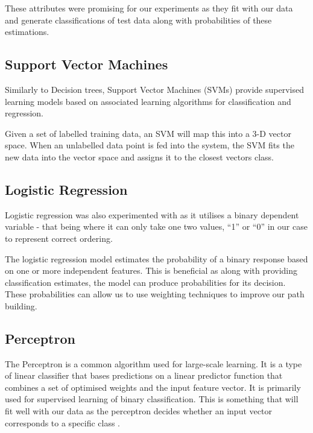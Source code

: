 \documentclass[bsc,frontabs,twoside,singlespacing,parskip,deptreport]{infthesis}     %
\begin{document}
These attributes were promising for our experiments as they fit with our data and generate
classifications of test data along with probabilities of these estimations.


\subsection{Support Vector Machines}
Similarly to Decision trees, Support Vector Machines (SVMs) provide supervised learning models based on
associated learning algorithms for classification and regression.

Given a set of labelled training data, an SVM will map this into a 3-D vector space.
When an unlabelled data point is fed into the system, the SVM fits the new data into the vector space and
assigns  it to the closest vectors class.

\subsection{Logistic Regression}
Logistic regression was also experimented with as it utilises a binary dependent variable - that being where it
can only take one two values, ``1'' or ``0'' in our case to represent correct ordering.


The logistic regression model estimates the probability of a binary response based on one or more independent features.
This is beneficial as along with providing classification estimates, the model can produce probabilities for its
decision. These probabilities can allow us to use weighting techniques to improve our path building.

\subsection{Perceptron}
The Perceptron is a common algorithm used for large-scale learning.
It is a type of linear classifier that bases predictions on a linear predictor function that combines a set of optimised weights
and the input feature vector.
It is primarily used for supervised learning of binary classification.
This is something that will fit well with our data as the perceptron decides whether an input vector
corresponds to a specific class \cite{freund1999large}.
\end{document}
